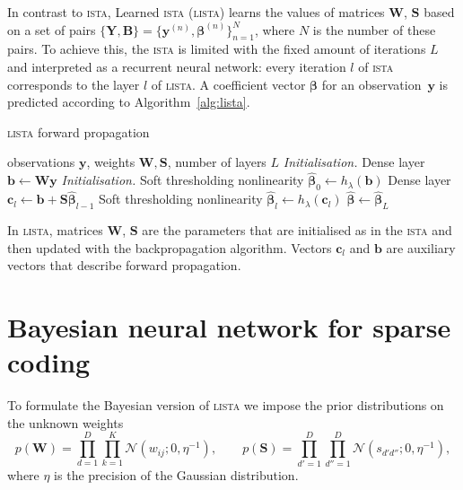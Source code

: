 \documentclass{article}
\begin{document}
  In contrast to \textsc{ista}, Learned \textsc{ista} (\textsc{lista}) \cite{gregor2010learning} learns the values of matrices $\mathbf{W}$, $\mathbf{S}$ based on a set of pairs $\{\mathbf{Y}, \mathbf{B}\}=\{\mathbf{y}^{(n)}, \boldsymbol\beta^{(n)}\}_{n=1}^N$, where $N$ is the number of these pairs. To achieve this, the \textsc{ista} is limited with the fixed amount of iterations $L$ and interpreted as a recurrent neural network: every iteration $l$ of \textsc{ista} corresponds to the layer $l$ of \textsc{lista}. A coefficient vector $\boldsymbol\beta$ for an observation~$\mathbf{y}$ is predicted according to Algorithm~\ref{alg:lista}.
  
  \begin{algorithm}[h]
    \caption{\textsc{lista} forward propagation}
    \label{alg:lista}
    \begin{algorithmic}[1]
      \REQUIRE observations $\mathbf{y}$, weights $\mathbf{W}, \mathbf{S}$, number of layers $L$
      \STATE \textit{Initialisation.} Dense layer $\mathbf{b} \gets \mathbf{W}\mathbf{y}$ \label{eq:first_layer}
      \STATE \textit{Initialisation.} Soft thresholding nonlinearity $\widehat{\boldsymbol\beta}_0 \gets h_\lambda(\mathbf{b})$ \label{eq:thr_first}
        \STATE Dense layer $\mathbf{c}_l \gets \mathbf{b} + \mathbf{S}\widehat{\boldsymbol\beta}_{l-1}$ \label{eq:l_dense_layer}
        \STATE Soft thresholding nonlinearity $\widehat{\boldsymbol\beta}_{l} \gets h_\lambda(\mathbf{c}_l)$ \label{eq:l_thr}
      \ENDFOR
      \RETURN $\widehat{\boldsymbol\beta} \gets \widehat{\boldsymbol\beta}_{L}$
    \end{algorithmic}
  \end{algorithm}

  In \textsc{lista}, matrices $\mathbf{W}$, $\mathbf{S}$ are the parameters that are initialised as in the \textsc{ista} and then updated with the backpropagation algorithm. Vectors $\mathbf{c}_l$ and $\mathbf{b}$ are auxiliary vectors that describe forward propagation.

  \section{Bayesian neural network for sparse coding}
  \label{sec:bayesian_lista}
  To formulate the Bayesian version of \textsc{lista} we impose the prior distributions on the unknown weights
  \begin{equation}
  \label{eq:ws}
  p(\mathbf{W}) = \prod_{d=1}^D\prod_{k=1}^K \mathcal{N}(w_{ij} ; 0, \eta^{-1}), \qquad
  p(\mathbf{S}) = \prod_{d'=1}^D\prod_{d''=1}^D \mathcal{N}(s_{d'd''} ; 0, \eta^{-1}),
  \end{equation}
  where $\eta$ is the precision of the Gaussian distribution.
  
\end{document}
